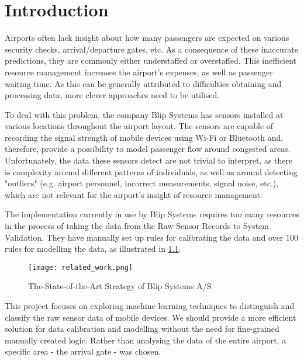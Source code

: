 \chapter{Introduction}
\label{chap:Intro}
\par
Airports often lack insight about how many passengers are expected on various security checks, arrival/departure gates, etc. As a consequence of these inaccurate predictions, they are commonly either understaffed or overstaffed. This inefficient resource management increases the airport’s expenses, as well as passenger waiting time. As this can be generally attributed to difficulties obtaining and processing data, more clever approaches need to be utilised.\newline

\par
To deal with this problem, the company Blip Systems has sensors installed at various locations throughout the airport layout. The sensors are capable of recording the signal strength of mobile devices using Wi-Fi or Bluetooth and, therefore, provide a possibility to model passenger flow around congested areas. Unfortunately, the data these sensors detect are not trivial to interpret, as there is complexity around different patterns of individuals, as well as around detecting "outliers" (e.g. airport personnel, incorrect measurements, signal noise, etc.), which are not relevant for the airport’s insight of resource management.\newline

\par
The implementation currently in use by Blip Systems requires too many resources in the process of taking the data from the Raw Sensor Records to System Validation. They have manually set up rules for calibrating the data and over 100 rules for modelling the data, as illustrated in \cref{fig:strategy_of_blip}.\newline
\begin{figure}[H]
	\centering
	\texttt{[image: related\_work.png]}
	\caption{The-State-of-the-Art Strategy of Blip Systems A/S}
	\label{fig:strategy_of_blip}
\end{figure}

\par
This project focuses on exploring machine learning techniques to distinguish and classify the raw sensor data of mobile devices. We should provide a more efficient solution for data calibration and modelling without the need for fine-grained manually created logic. Rather than analysing the data of the entire airport, a specific area - the arrival gate - was chosen.\newline

